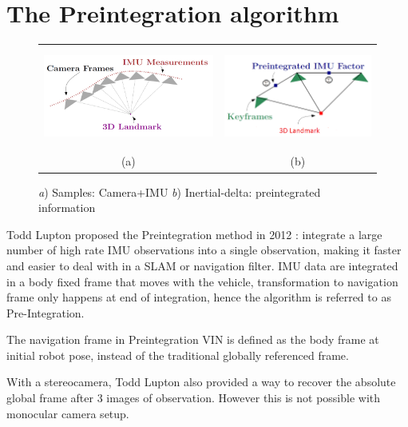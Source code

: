 \documentclass[12pt]{article}   %
\begin{document}
\section{The Preintegration algorithm}

\begin{figure}[!h]
	\begin{center}\begin{tabular}{cc}
			\includegraphics[height=3.3cm]{figures/IMU-sample_Image-frames_3D_illustration.png}&
			\includegraphics[height=3.3cm]{Figures/Preintegrated-IMU_image_3D_illustration.png}\\
			(a) & (b) \\
		\end{tabular}\end{center}
		\caption{\emph{a}) Samples: Camera+IMU \emph{b}) Inertial-delta: preintegrated information \cite{Manifold2015}} 
		\label{fig:VIN sensor information}
	\end{figure} 
Todd Lupton proposed the Preintegration method in 2012 \cite{Lupton2012}: integrate a large number of high rate IMU observations into a single observation, making it faster and easier to deal with in a SLAM or navigation filter. IMU data are integrated in a body fixed frame that moves with the vehicle, transformation to navigation frame only happens at end of integration, hence the algorithm is referred to as Pre-Integration.

The navigation frame in Preintegration VIN is defined as the body frame at initial robot pose, instead of the traditional globally referenced frame.

With a stereocamera, Todd Lupton also provided a way to recover the absolute global frame after 3 images of observation. However this is not possible with monocular camera setup.
\end{document}
